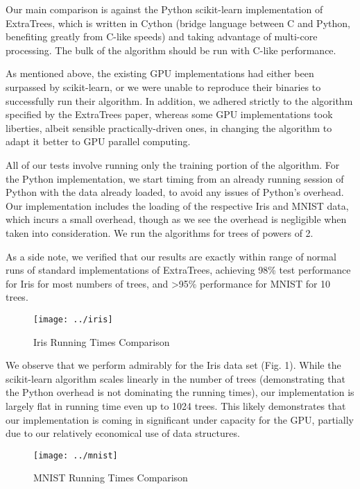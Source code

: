\documentclass[10pt,conference]{IEEEtran}
\begin{document}
Our main comparison is against the Python scikit-learn implementation of ExtraTrees, which is written in Cython (bridge language between C and Python, benefiting greatly from C-like speeds) and taking advantage of multi-core processing. The bulk of the algorithm should be run with C-like performance.

As mentioned above, the existing GPU implementations had either been surpassed by scikit-learn, or we were unable to reproduce their binaries to successfully run their algorithm. In addition, we adhered strictly to the algorithm specified by the ExtraTrees paper, whereas some GPU implementations took liberties, albeit sensible practically-driven ones, in changing the algorithm to adapt it better to GPU parallel computing.

All of our tests involve running only the training portion of the algorithm. For the Python implementation, we start timing from an already running session of Python with the data already loaded, to avoid any issues of Python's overhead. Our implementation includes the loading of the respective Iris and MNIST data, which incurs a small overhead, though as we see the overhead is negligible when taken into consideration.  We run the algorithms for trees of powers of 2.

As a side note, we verified that our results are exactly within range of normal runs of standard implementations of ExtraTrees, achieving 98\% test performance for Iris for most numbers of trees, and >95\% performance for MNIST for 10 trees.

\begin{figure}
  \centering
  \texttt{[image: ../iris]}
  \caption{Iris Running Times Comparison}
\end{figure}

We observe that we perform admirably for the Iris data set (Fig. 1). While the scikit-learn algorithm scales linearly in the number of trees (demonstrating that the Python overhead is not dominating the running times), our implementation is largely flat in running time even up to 1024 trees. This likely demonstrates that our implementation is coming in significant under capacity for the GPU, partially due to our relatively economical use of data structures.

\begin{figure}
  \centering
  \texttt{[image: ../mnist]}
  \caption{MNIST Running Times Comparison}
\end{figure}
\end{document}
